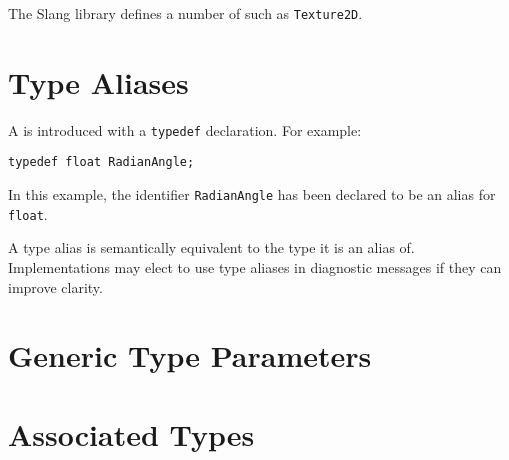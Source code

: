 The Slang library defines a number of  such as \lstinline|Texture2D|.

\section{Type Aliases}

A  is introduced with a \lstinline|typedef| declaration.
For example:

\begin{lstlisting}
typedef float RadianAngle;
\end{lstlisting}

In this example, the identifier \lstinline|RadianAngle| has been declared to be an alias for \lstinline|float|.

A type alias is semantically equivalent to the type it is an alias of.
Implementations may elect to use type aliases in diagnostic messages if they can improve clarity.

\section{Generic Type Parameters}

\section{Associated Types}

